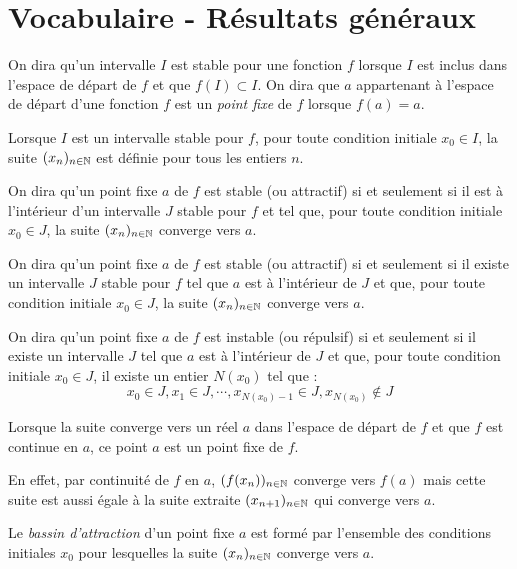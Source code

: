 \section{Vocabulaire - Résultats généraux}
\begin{defi}
 On dira qu'un intervalle $I$ est stable  pour une fonction $f$ lorsque $I$ est inclus dans l'espace de départ de $f$ et que $f(I)\subset I$.\newline
On dira que $a$ appartenant à l'espace de départ d'une fonction $f$ est un \emph{point fixe} de $f$ lorsque $f(a)=a$.  
\end{defi}
\begin{prop}
 Lorsque $I$ est un intervalle stable pour $f$, pour toute condition initiale $x_0\in I$, la suite $(x_n)_{n\in \mathbb{N}}$ est définie pour tous les entiers $n$.
\end{prop}
\begin{defi}
 On dira qu'un point fixe $a$ de $f$ est stable (ou attractif) si et seulement si il est à l'intérieur d'un intervalle $J$ stable pour $f$ et tel que, pour toute condition initiale $x_0\in J$, la suite $(x_n)_{n\in \mathbb{N}}$ converge vers $a$.
\end{defi}
\begin{defi}
 On dira qu'un point fixe $a$ de $f$ est stable (ou attractif) si et seulement si il existe un intervalle $J$ stable pour $f$ tel que $a$ est à l'intérieur de $J$ et que, pour toute condition initiale $x_0\in J$, la suite $(x_n)_{n\in \mathbb{N}}$ converge vers $a$.
\end{defi}
\begin{defi}
 On dira qu'un point fixe $a$ de $f$ est instable (ou répulsif) si et seulement si il existe un intervalle $J$ tel que $a$ est à l'intérieur de $J$ et que, pour toute condition initiale $x_0\in J$, il existe un entier $N(x_0)$ tel que :
\begin{displaymath}
 x_0\in J, x_1\in J, \cdots , x_{N(x_0)-1}\in J, x_{N(x_0)} \not \in J
\end{displaymath}
\end{defi}
\begin{prop}
 Lorsque la suite converge vers un réel $a$ dans l'espace de départ de $f$ et que $f$ est continue en $a$, ce point $a$ est un point fixe de $f$.
\end{prop}
\begin{demo}
 En effet, par continuité de $f$ en $a$, $(f(x_{n}))_{n\in \mathbb{N}}$ converge vers $f(a)$ mais cette suite est aussi égale à la suite extraite $(x_{n+1})_{n\in \mathbb{N}}$ qui converge vers $a$.
\end{demo}
\begin{defi}
Le \emph{bassin d'attraction} d'un point fixe $a$ est formé par l'ensemble des conditions initiales $x_0$ pour lesquelles la suite $(x_{n})_{n\in \mathbb{N}}$ converge vers $a$.
\end{defi}

